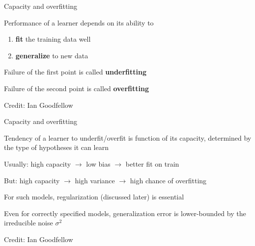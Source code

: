 \documentclass[11pt,compress,t,notes=noshow, xcolor=table]{beamer}
\begin{document}
\begin{framei}[sep=L]{Capacity and overfitting}

\item Performance of a learner depends on its ability to 
\begin{enumerate}
\item \textbf{fit} the training data well
\item \textbf{generalize} to new data
\end{enumerate}  
\item Failure of the first point is called \textbf{underfitting}
\item Failure of the second point is called \textbf{overfitting}

\tiny \centering
Credit: Ian Goodfellow

\end{framei}

\begin{framei}[sep=M]{Capacity and overfitting}

\item Tendency of a learner to underfit/overfit is function of its capacity, determined by the type of hypotheses it can learn
\item Usually: high capacity $\rightarrow$ low bias $\rightarrow$ better fit on train
\item But: high capacity $\rightarrow$ high variance $\rightarrow$ high chance of overfitting
\item For such models, regularization (discussed later) is essential
\item Even for correctly specified models, generalization error is lower-bounded by the irreducible noise $\sigma^2$

\tiny \centering
Credit: Ian Goodfellow

\end{framei}

\endlecture
\end{document}
